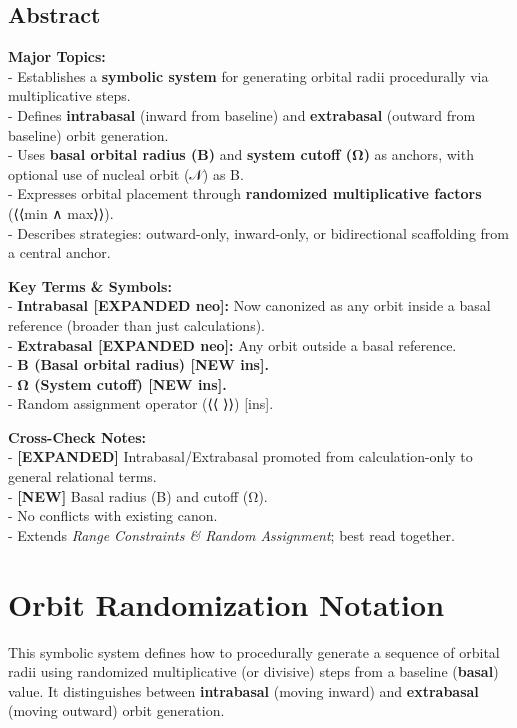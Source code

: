 \documentclass[
  letterpaper,
]{book}
\begin{document}
\section{Abstract}\label{abstract-27}

\textbf{Major Topics:}\\
- Establishes a \textbf{symbolic system} for generating orbital radii
procedurally via multiplicative steps.\\
- Defines \textbf{intrabasal} (inward from baseline) and
\textbf{extrabasal} (outward from baseline) orbit generation.\\
- Uses \textbf{basal orbital radius (B)} and \textbf{system cutoff (Ω)}
as anchors, with optional use of nucleal orbit (𝒩) as B.\\
- Expresses orbital placement through \textbf{randomized multiplicative
factors} (⟨⟨min ∧ max⟩⟩).\\
- Describes strategies: outward-only, inward-only, or bidirectional
scaffolding from a central anchor.

\textbf{Key Terms \& Symbols:}\\
- \textbf{Intrabasal {[}EXPANDED neo{]}:} Now canonized as any orbit
inside a basal reference (broader than just calculations).\\
- \textbf{Extrabasal {[}EXPANDED neo{]}:} Any orbit outside a basal
reference.\\
- \textbf{B (Basal orbital radius) {[}NEW ins{]}.}\\
- \textbf{Ω (System cutoff) {[}NEW ins{]}.}\\
- Random assignment operator (⟨⟨ ⟩⟩) {[}ins{]}.

\textbf{Cross-Check Notes:}\\
- \textbf{{[}EXPANDED{]}} Intrabasal/Extrabasal promoted from
calculation-only to general relational terms.\\
- \textbf{{[}NEW{]}} Basal radius (B) and cutoff (Ω).\\
- No conflicts with existing canon.\\
- Extends \emph{Range Constraints \& Random Assignment}; best read
together.

\chapter{Orbit Randomization
Notation}\label{orbit-randomization-notation}

This symbolic system defines how to procedurally generate a sequence of
orbital radii using randomized multiplicative (or divisive) steps from a
baseline (\textbf{basal}) value. It distinguishes between
\textbf{intrabasal} (moving inward) and \textbf{extrabasal} (moving
outward) orbit generation.
\end{document}
